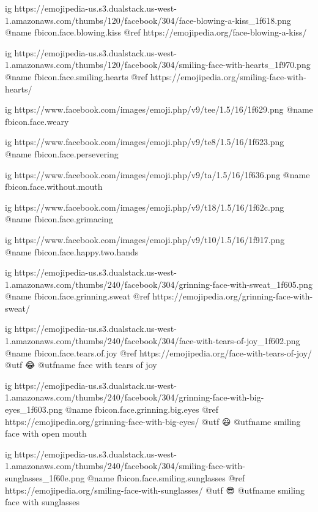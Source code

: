  
 
 
 
 

\ifcmt

  ig https://emojipedia-us.s3.dualstack.us-west-1.amazonaws.com/thumbs/120/facebook/304/face-blowing-a-kiss_1f618.png
  @name fbicon.face.blowing.kiss
  @ref https://emojipedia.org/face-blowing-a-kiss/

  ig https://emojipedia-us.s3.dualstack.us-west-1.amazonaws.com/thumbs/120/facebook/304/smiling-face-with-hearts_1f970.png
  @name fbicon.face.smiling.hearts
  @ref https://emojipedia.org/smiling-face-with-hearts/

  ig https://www.facebook.com/images/emoji.php/v9/tee/1.5/16/1f629.png
  @name fbicon.face.weary

  ig https://www.facebook.com/images/emoji.php/v9/te8/1.5/16/1f623.png
  @name fbicon.face.persevering

  ig https://www.facebook.com/images/emoji.php/v9/ta/1.5/16/1f636.png
  @name fbicon.face.without.mouth

  ig https://www.facebook.com/images/emoji.php/v9/t18/1.5/16/1f62c.png
  @name fbicon.face.grimacing

  ig https://www.facebook.com/images/emoji.php/v9/t10/1.5/16/1f917.png
  @name fbicon.face.happy.two.hands

  ig https://emojipedia-us.s3.dualstack.us-west-1.amazonaws.com/thumbs/240/facebook/304/grinning-face-with-sweat_1f605.png
  @name fbicon.face.grinning.sweat
  @ref https://emojipedia.org/grinning-face-with-sweat/

  ig https://emojipedia-us.s3.dualstack.us-west-1.amazonaws.com/thumbs/240/facebook/304/face-with-tears-of-joy_1f602.png
  @name fbicon.face.tears.of.joy
  @ref https://emojipedia.org/face-with-tears-of-joy/
  @utf 😂
  @utfname face with tears of joy

  ig https://emojipedia-us.s3.dualstack.us-west-1.amazonaws.com/thumbs/240/facebook/304/grinning-face-with-big-eyes_1f603.png
  @name fbicon.face.grinning.big.eyes
  @ref https://emojipedia.org/grinning-face-with-big-eyes/
  @utf 😃
  @utfname smiling face with open mouth

  ig https://emojipedia-us.s3.dualstack.us-west-1.amazonaws.com/thumbs/240/facebook/304/smiling-face-with-sunglasses_1f60e.png 
  @name fbicon.face.smiling.sunglasses
  @ref https://emojipedia.org/smiling-face-with-sunglasses/
  @utf 😎
  @utfname smiling face with sunglasses

